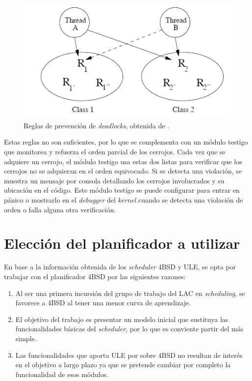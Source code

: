 \documentclass[a4paper]{book}
\begin{document}
\begin{figure}[t]
	\begin{center}
		\includegraphics[scale=0.6]{./imagenes/prevenciondeadlocks.png}
		\caption{Reglas de prevenci\'on de \emph{deadlocks}, obtenida de \cite[Capitulo 4]{freebsdOS}.}
	\end{center}
\end{figure}

Estas reglas no son suficientes, por lo que se complementa con un módulo testigo que monitorea y refuerza el orden parcial de los cerrojos. Cada vez que se adquiere un cerrojo, el módulo testigo usa estas dos listas para verificar que los cerrojos no se adquieran en el orden equivocado. Si se detecta una violación, se muestra un mensaje por consola detallando los cerrojos involucrados y su ubicación en el código. Este módulo testigo se puede configurar para entrar en pánico o mostrarlo en el \emph{debugger} del \emph{kernel} cuando se detecta una violación de orden o falla alguna otra verificación.\\

\section{Elecci\'on del planificador a utilizar}

En base a la informaci\'on obtenida de los \emph{scheduler} 4BSD y ULE, se opta por trabajar con el planificador 4BSD por las siguientes razones:

\begin{enumerate}
\item Al ser una primera incursi\'on del grupo de trabajo del LAC en \emph{scheduling}, se favorece a 4BSD al tener una menor curva de aprendizaje.
\item El objetivo del trabajo es presentar un modelo inicial que sustituya las funcionalidades b\'asicas del \emph{scheduler}, por lo que es conviente partir del m\'as simple.
\item Las funcionalidades que aporta ULE por sobre 4BSD no resultan de inter\'es en el objetivo a largo plazo ya que se pretende cambiar por completo la funcionalidad de esos m\'odulos.
\end{enumerate}
\end{document}
